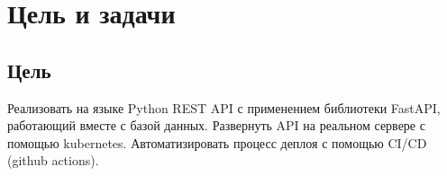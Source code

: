 \chapter*{Цель и задачи}

\section{Цель}
Реализовать на языке Python REST API с применением библиотеки FastAPI, работающий вместе с базой данных. Развернуть API на реальном сервере с помощью
kubernetes. Автоматизировать процесс деплоя с помощью CI/CD (github actions).
\endinput